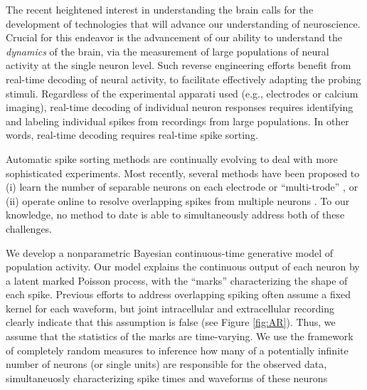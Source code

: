 
The recent heightened interest in understanding the brain calls for the development of technologies that will advance our understanding of neuroscience. %
Crucial for this endeavor is the advancement of our ability to understand the \emph{dynamics} of the brain, via the measurement of large populations of 
neural activity at the single neuron level.  Such reverse engineering efforts  benefit from real-time decoding of neural activity, to 
facilitate effectively adapting the probing stimuli. 
Regardless of the experimental apparati used (e.g., electrodes or calcium imaging), real-time decoding of individual neuron responses requires identifying and labeling individual spikes from recordings from large populations.
In other words, real-time decoding requires real-time spike sorting.

Automatic spike sorting methods are continually evolving to deal with more sophisticated experiments.  Most recently, several methods have been proposed to (i) learn the number of separable neurons on each electrode or ``multi-trode'' \cite{Pillow2013,Prentice2011}, or (ii) operate online to resolve overlapping spikes from multiple neurons \cite{Franke2010}.   To our knowledge, no method to date is able to simultaneously address both of these challenges.  

We develop a nonparametric Bayesian continuous-time generative model of population activity.  Our model explains the continuous output of each neuron
by a latent marked Poisson process, with the ``marks'' characterizing the shape of each spike.  Previous efforts to address overlapping spiking often assume a fixed kernel for each waveform, but joint intracellular and extracellular recording clearly indicate that this assumption is false (see Figure \ref{fig:AR}). Thus, we assume that the statistics of the marks are time-varying.  
We use the framework of completely random measures to inference how many of a potentially infinite number of neurons (or single units)
are responsible for the observed data,  simultaneuosly characterizing spike times and waveforms of these neurons

